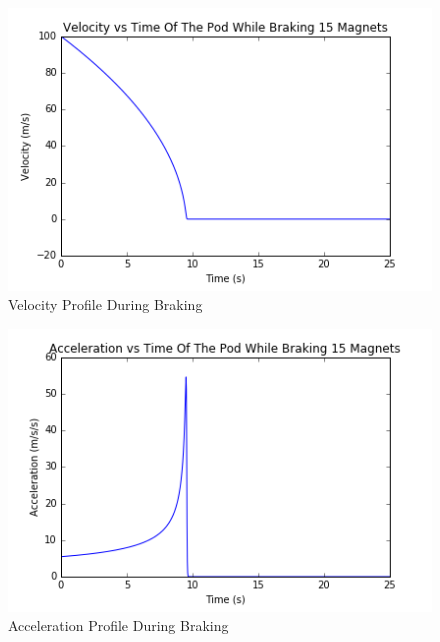 \documentclass[main.tex]{subfiles}
\begin{document}
 	\begin{figure}[H]
        \centering
        \includegraphics[width=\linewidth]{images/velocity_time_graph}
        \caption{Velocity Profile During Braking}
        \label{fig:velocity-profile}
    \end{figure}
    \begin{figure}[H]
        \centering
        \includegraphics[width=\linewidth]{images/acceleration_time_graph}
        \caption{Acceleration Profile During Braking}
        \label{fig:accelation-profile}
    \end{figure} 
\end{document}
